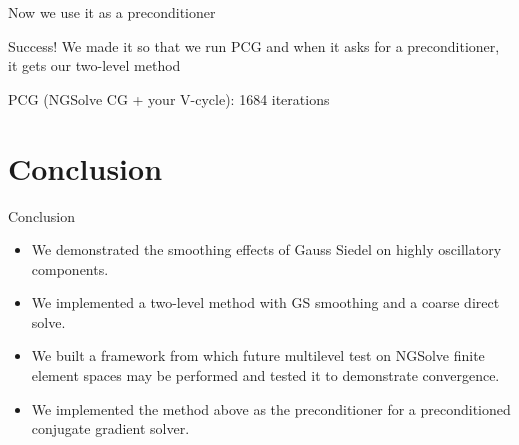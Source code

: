 \documentclass[aspectratio=169,11pt]{beamer}
\begin{document}
\begin{centering}
\begin{frame}{Now we use it as a preconditioner}
  \begin{alert}{Success!}
  We made it so that we run PCG and when it asks for a preconditioner, it gets our two-level method
  \end{alert}
  PCG (NGSolve CG + your V-cycle): 1684 iterations
\end{frame}

\section{Conclusion}
\begin{frame}{Conclusion}
  \begin{itemize}
    \item We demonstrated the smoothing effects of Gauss Siedel on highly oscillatory components.
    \item We implemented a two-level method with GS smoothing and a coarse direct solve.
    \item We built a framework from which future multilevel test on NGSolve finite element spaces may be performed and tested it to demonstrate convergence.
    \item We implemented the method above as the preconditioner for a preconditioned conjugate gradient solver.
  \end{itemize}
\end{frame}
\end{centering}
\end{document}
